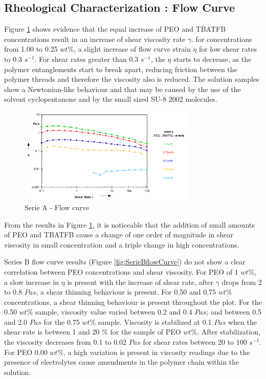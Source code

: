 \subsection{Rheological Characterization : \textbf{Flow Curve}}

Figure \ref{fig:SerieAflowCurve} shows evidence that the equal increase of PEO and TBATFB concentrations result in an increase of shear viscosity rate $\gamma$. for concentrations from 1.00 to 0.25 $w t \%$, a slight increase of flow curve strain $\eta$ for low shear rates to 0.3 $s^{-1}$. For shear rates greater than 0.3 $s^{-1}$, the $\eta$ starts to decrease, as the polymer entanglements start to break apart, reducing friction between the polymer threads and therefore the viscosity also is reduced. The solution samples show a Newtonian-like behaviour and that may be caused by the use of the solvent cyclopentanone and by the small sized SU-8 2002 molecules.

\begin{figure}[th]
\centering
\includegraphics[width=0.75\textwidth]{./Figures/SerieAflowCurve.png}
\decoRule
\caption[Serie A - Flow curve]{Serie A - Flow curve}
\label{fig:SerieAflowCurve}
\end{figure}

From the results in Figure \ref{fig:SerieAflowCurve}, it is noticeable that the addition of small amounts of PEO and TBATFB cause a change of one order of magnitude in shear viscosity in small concentration and a triple change in high concentrations.

Series B flow curve results (Figure \ref{fig:SerieBflowCurve}) do not show a clear correlation between PEO concentrations and shear viscosity. For PEO of 1 $w t \%$, a slow increase in $\eta$ is present with the increase of shear rate, after $\gamma$ drops from 2 to 0.8 $Pa s$, a shear thinning behaviour is present. For 0.50 and 0.75 $w t \%$ concentrations, a shear thinning behaviour is present throughout the plot. For the 0.50 $w t \%$ sample, viscosity value varied between 0.2 and 0.4 $Pa s$; and between 0.5 and 2.0 $Pa s$ for the 0.75 $w t \%$ sample. Viscosity is stabilized at 0.1 $Pa s$ when the shear rate is between 1 and 20 \% for the sample of PEO $w t \%$. After stabilization, the viscosity decreases from 0.1 to 0.02 $Pa s$ for shear rates between 20 to 100 $s^{-1}$. For PEO 0.00 $w t \%$, a high variation is present in viscosity readings due to the presence of electrolytes cause amendments in the polymer chain within the solution.

